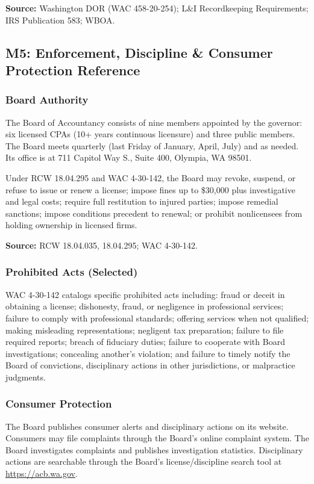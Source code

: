 \documentclass[11pt,letterpaper]{article}
\begin{document}
\textbf{Source:} Washington DOR (WAC 458-20-254); L\&I Recordkeeping Requirements; IRS Publication 583; WBOA.

\subsection{M5: Enforcement, Discipline \& Consumer Protection Reference}

\subsubsection{Board Authority}

The Board of Accountancy consists of nine members appointed by the governor: six licensed CPAs (10+ years continuous licensure) and three public members. The Board meets quarterly (last Friday of January, April, July) and as needed. Its office is at 711 Capitol Way S., Suite 400, Olympia, WA 98501.

Under RCW 18.04.295 and WAC 4-30-142, the Board may revoke, suspend, or refuse to issue or renew a license; impose fines up to \$30,000 plus investigative and legal costs; require full restitution to injured parties; impose remedial sanctions; impose conditions precedent to renewal; or prohibit nonlicensees from holding ownership in licensed firms.

\textbf{Source:} RCW 18.04.035, 18.04.295; WAC 4-30-142.

\subsubsection{Prohibited Acts (Selected)}

WAC 4-30-142 catalogs specific prohibited acts including: fraud or deceit in obtaining a license; dishonesty, fraud, or negligence in professional services; failure to comply with professional standards; offering services when not qualified; making misleading representations; negligent tax preparation; failure to file required reports; breach of fiduciary duties; failure to cooperate with Board investigations; concealing another's violation; and failure to timely notify the Board of convictions, disciplinary actions in other jurisdictions, or malpractice judgments.

\subsubsection{Consumer Protection}

The Board publishes consumer alerts and disciplinary actions on its website. Consumers may file complaints through the Board's online complaint system. The Board investigates complaints and publishes investigation statistics. Disciplinary actions are searchable through the Board's license/discipline search tool at \url{https://acb.wa.gov}.
\end{document}
